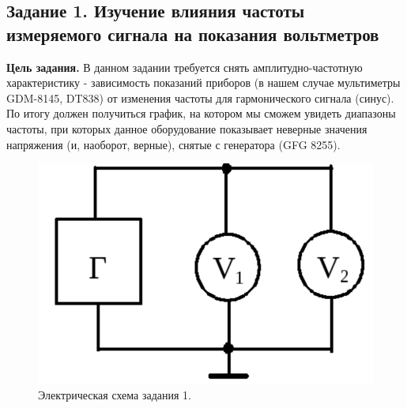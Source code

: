 \documentclass[a4paper,12pt]{article}
\begin{document}
\subsection{Задание 1. Изучение влияния частоты измеряемого сигнала на показания вольтметров}
\textbf{Цель задания.} В данном задании требуется снять амплитудно-частотную характеристику - зависимость показаний приборов (в нашем случае мультиметры GDM-8145, DT838) от изменения частоты для гармонического сигнала (синус). По итогу должен получиться график, на котором мы сможем увидеть диапазоны частоты, при которых данное оборудование показывает неверные значения напряжения (и, наоборот, верные), снятые с генератора (GFG 8255). 

\begin{figure}[h!]
	\begin{center}
		\includegraphics[scale=0.4]{scheme_1.png}
	\end{center}
	\caption{Электрическая схема задания 1.}

\end{figure}
\end{document}
